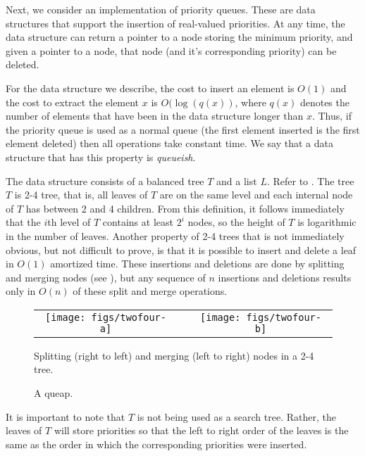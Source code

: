 {Next, we consider an implementation of priority queues.  These are
data structures that support the insertion of real-valued priorities.
At any time, the data structure can return a pointer to a node storing
the minimum priority, and given a pointer to a node, that node (and
it's corresponding priority) can be deleted.

For the data structure we describe, the cost to insert an element is
$O(1)$ and the cost to extract the element $x$ is $O(\log(q(x))$,
where $q(x)$ denotes the number of elements that have been in the data
structure longer than $x$.  Thus, if the priority queue is used as a
normal queue (the first element inserted is the first element deleted)
then all operations take constant time.  We say that a data structure
that has this property is \emph{queueish}.

The data structure consists of a balanced tree $T$ and a list $L$.
Refer to . The tree $T$ is 2-4 tree, that is, all leaves
of $T$ are on the same level and each internal node of $T$ has between
2 and 4 children.  From this definition, it follows immediately that
the $i$th level of $T$ contains at least $2^i$ nodes, so the height of
$T$ is logarithmic in the number of leaves.  Another property of 2-4
trees that is not immediately obvious, but not difficult to prove, is
that it is possible to insert and delete a leaf in $O(1)$ amortized
time.  These insertions and deletions are done by splitting and
merging nodes (see
), but any sequence of $n$ insertions and deletions
results only in $O(n)$ of these split and merge operations.

\begin{figure}
\begin{center}\begin{tabular}{ccc}
\texttt{[image: figs/twofour-a]} & \raisebox{.6cm}{$\Leftrightarrow$} & \texttt{[image: figs/twofour-b]}
\end{tabular}\end{center}
\caption{Splitting (right to left) and merging (left to right) nodes in a 2-4 tree.}
\end{figure}

\begin{figure}
\caption{A queap.}
\end{figure}

It is important to note that $T$ is not being used as a search tree.
Rather, the leaves of $T$ will store priorities so that the left to
right order of the leaves is the same as the order in which the
corresponding priorities were inserted.

}
